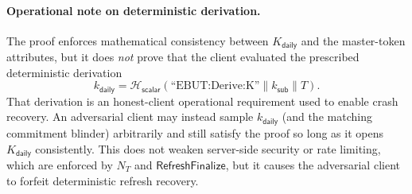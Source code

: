\documentclass[11pt]{article}
\theoremstyle{definitionstyle}
\theoremstyle{plain}
\begin{document}
\paragraph{Operational note on deterministic derivation.}
The proof enforces mathematical consistency between $K_{\mathsf{daily}}$ and the master-token attributes, but it does \emph{not} prove that the client evaluated the prescribed deterministic derivation
\[
k_{\mathsf{daily}} = \mathcal{H}_{\mathsf{scalar}}(\text{``EBUT:Derive:K''} \parallel k_{\mathsf{sub}} \parallel T).
\]
That derivation is an honest-client operational requirement used to enable crash recovery. An adversarial client may instead sample $k_{\mathsf{daily}}$ (and the matching commitment blinder) arbitrarily and still satisfy the proof so long as it opens $K_{\mathsf{daily}}$ consistently. This does not weaken server-side security or rate limiting, which are enforced by $N_T$ and $\mathsf{RefreshFinalize}$, but it causes the adversarial client to forfeit deterministic refresh recovery.
\end{document}
